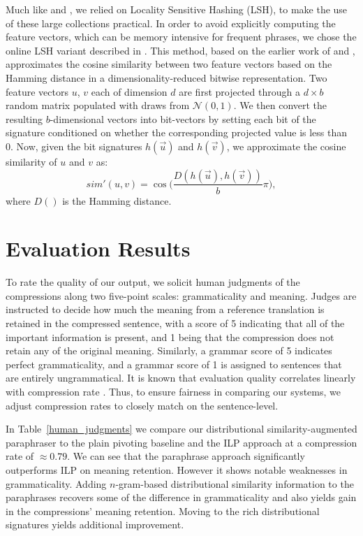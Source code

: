 \documentclass[11pt]{article}
\begin{document}
Much like  and , we
relied on Locality Sensitive Hashing (LSH), to make the use of these
large collections practical. In order to avoid explicitly computing
the feature vectors, which can be memory intensive for frequent
phrases, we chose the online LSH variant described in
\cite{VanDurmeLallACL10}. This method, based on the earlier work of
 and , approximates the
cosine similarity between two feature vectors based on the Hamming
distance in a dimensionality-reduced bitwise representation. Two
feature vectors $u$, $v$ each of dimension $d$ are first projected
through a $d \times b$ random matrix populated with draws from
$\mathcal{N}(0,1)$. We then convert the resulting $b$-dimensional
vectors into bit-vectors by setting each bit of the signature
conditioned on whether the corresponding projected value is less than
0. Now, given the bit signatures $h(\vec{u})$ and $h(\vec{v})$, we
approximate the cosine similarity of $u$ and $v$ as:
\begin{equation*}
  \mathit{sim'}(u, v) =
  \cos\Big(\frac{D(h(\vec{u}),h(\vec{v}))}{b}\pi\Big) ,
\end{equation*}
where $D()$ is the Hamming distance.




\section{Evaluation Results}
\label{sec-results}

To rate the quality of our output, we solicit human judgments of the
compressions along two five-point scales: grammaticality and
meaning. Judges are instructed to decide how much the meaning from a
reference translation is retained in the compressed sentence, with a
score of 5 indicating that all of the important information is
present, and 1 being that the compression does not retain any of the
original meaning. Similarly, a grammar score of 5 indicates perfect
grammaticality, and a grammar score of 1 is assigned to sentences that
are entirely ungrammatical. It is known that evaluation quality
correlates linearly with compression rate \cite{Napoles2011}. Thus, to
ensure fairness in comparing our systems, we adjust compression rates
to closely match on the sentence-level.

In Table~\ref{human_judgments} we compare our distributional
similarity-augmented paraphraser to the plain pivoting baseline and
the ILP approach at a compression rate of $\approx 0.79$. We can see
that the paraphrase approach significantly outperforms ILP on meaning
retention. However it shows notable weaknesses in
grammaticality. Adding $n$-gram-based distributional similarity
information to the paraphrases recovers some of the difference in
grammaticality and also yields gain in the compressions' meaning
retention. Moving to the rich distributional signatures yields
additional improvement.
\end{document}
